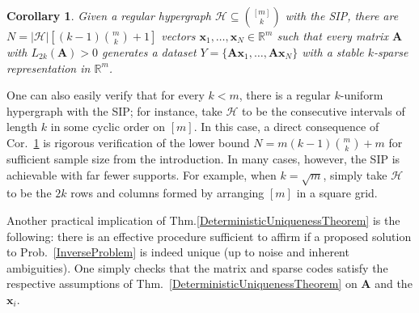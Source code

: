 \documentclass[9pt,twocolumn]{pnas-new}
\newtheorem{corollary}{Corollary}
\begin{document}
\begin{corollary}\label{DeterministicUniquenessCorollary}
Given a regular hypergraph $\mathcal{H} \subseteq {[m] \choose k}$ with the SIP, there are $N =  |\mathcal{H}| \left[ (k-1){m \choose k} + 1  \right]$ vectors \mbox{$\mathbf{x}_1, \ldots, \mathbf{x}_N \in \mathbb{R}^m$} such that every matrix $\mathbf{A}$ with $L_{2k}(\mathbf{A}) > 0$ generates a dataset $Y = \{\mathbf{A}\mathbf{x}_1, \ldots, \mathbf{A}\mathbf{x}_N\}$ with a stable $k$-sparse representation in $\mathbb{R}^m$.
\end{corollary}

One can also easily verify that for every $k < m$, there is a regular $k$-uniform hypergraph with the SIP; for instance, take $\mathcal{H}$ to be the consecutive intervals of length $k$ in some cyclic order on $[m]$.  In this case, a direct consequence of Cor.~\ref{DeterministicUniquenessCorollary} is rigorous verification of the lower bound \mbox{$N = m(k-1){m \choose k} + m$} for sufficient sample size from the introduction. In many cases, however, the SIP is achievable with far fewer supports.  For example, when $k = \sqrt{m}$, simply take $\mathcal{H}$ to be the $2k$ rows and columns formed by arranging $[m]$ in a square grid.

Another practical implication of Thm.\ref{DeterministicUniquenessTheorem} is the following: there is an effective procedure sufficient to affirm if a proposed solution to Prob.~\ref{InverseProblem} is indeed unique (up to noise and inherent ambiguities). One simply checks that the matrix and sparse codes satisfy the respective assumptions of Thm.~\ref{DeterministicUniquenessTheorem} on $\mathbf{A}$ and the $\mathbf{x}_i$.  
\end{document}

